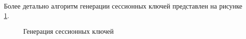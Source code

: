 Более детально алгоритм генерации сессионных ключей представлен на рисунке \ref{img:sk_derivation2}.

\begin{figure}[h!]
\caption{Генерация сессионных ключей}
\label{img:sk_derivation2}
\end{figure}
